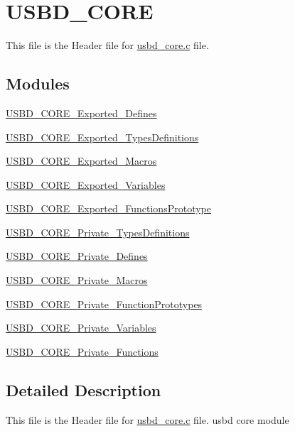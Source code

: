 \hypertarget{group___u_s_b_d___c_o_r_e}{\section{U\-S\-B\-D\-\_\-\-C\-O\-R\-E}
\label{group___u_s_b_d___c_o_r_e}
}


This file is the Header file for \hyperlink{usbd__core_8c}{usbd\-\_\-core.\-c} file.  


\subsection*{Modules}
\begin{DoxyCompactItemize}
\item 
\hyperlink{group___u_s_b_d___c_o_r_e___exported___defines}{U\-S\-B\-D\-\_\-\-C\-O\-R\-E\-\_\-\-Exported\-\_\-\-Defines}
\item 
\hyperlink{group___u_s_b_d___c_o_r_e___exported___types_definitions}{U\-S\-B\-D\-\_\-\-C\-O\-R\-E\-\_\-\-Exported\-\_\-\-Types\-Definitions}
\item 
\hyperlink{group___u_s_b_d___c_o_r_e___exported___macros}{U\-S\-B\-D\-\_\-\-C\-O\-R\-E\-\_\-\-Exported\-\_\-\-Macros}
\item 
\hyperlink{group___u_s_b_d___c_o_r_e___exported___variables}{U\-S\-B\-D\-\_\-\-C\-O\-R\-E\-\_\-\-Exported\-\_\-\-Variables}
\item 
\hyperlink{group___u_s_b_d___c_o_r_e___exported___functions_prototype}{U\-S\-B\-D\-\_\-\-C\-O\-R\-E\-\_\-\-Exported\-\_\-\-Functions\-Prototype}
\item 
\hyperlink{group___u_s_b_d___c_o_r_e___private___types_definitions}{U\-S\-B\-D\-\_\-\-C\-O\-R\-E\-\_\-\-Private\-\_\-\-Types\-Definitions}
\item 
\hyperlink{group___u_s_b_d___c_o_r_e___private___defines}{U\-S\-B\-D\-\_\-\-C\-O\-R\-E\-\_\-\-Private\-\_\-\-Defines}
\item 
\hyperlink{group___u_s_b_d___c_o_r_e___private___macros}{U\-S\-B\-D\-\_\-\-C\-O\-R\-E\-\_\-\-Private\-\_\-\-Macros}
\item 
\hyperlink{group___u_s_b_d___c_o_r_e___private___function_prototypes}{U\-S\-B\-D\-\_\-\-C\-O\-R\-E\-\_\-\-Private\-\_\-\-Function\-Prototypes}
\item 
\hyperlink{group___u_s_b_d___c_o_r_e___private___variables}{U\-S\-B\-D\-\_\-\-C\-O\-R\-E\-\_\-\-Private\-\_\-\-Variables}
\item 
\hyperlink{group___u_s_b_d___c_o_r_e___private___functions}{U\-S\-B\-D\-\_\-\-C\-O\-R\-E\-\_\-\-Private\-\_\-\-Functions}
\end{DoxyCompactItemize}


\subsection{Detailed Description}
This file is the Header file for \hyperlink{usbd__core_8c}{usbd\-\_\-core.\-c} file. usbd core module